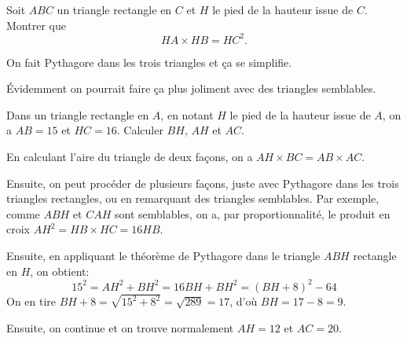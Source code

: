\begin{exo}
Soit $ABC$ un triangle rectangle en $C$ et $H$ le pied de la hauteur issue de $C$.
Montrer que 
\[ HA\times HB = HC^2.\]
\begin{center}
\end{center}
\begin{sol}
On fait Pythagore dans les trois triangles et ça se simplifie.

Évidemment on pourrait faire ça plus joliment avec des triangles semblables.
\end{sol}
\end{exo}





\begin{exo}
Dans un triangle rectangle en $A$, en notant $H$ le pied de la hauteur issue de $A$, on a $AB=15$ et $HC=16$.
Calculer $BH$, $AH$ et $AC$.
\begin{center}
\end{center}
\begin{sol}
En calculant l'aire du triangle de deux façons, on a $AH\times BC = AB\times AC$.

Ensuite, on peut procéder de plusieurs façons, juste avec Pythagore dans les trois triangles rectangles, ou en remarquant des triangles semblables.
Par exemple, comme $ABH$ et $CAH$ sont semblables, on a, par proportionnalité, le produit en croix $AH^2=HB\times HC = 16 HB$.

Ensuite, en appliquant le théorème de Pythagore dans le triangle $ABH$ rectangle en $H$, on obtient:
\[ 15^2 = AH^2+BH^2 = 16BH+BH^2 = (BH+8)^2-64\]
On en tire $BH+8=\sqrt{15^2+8^2}=\sqrt{289}=17$, d'où $BH=17-8=9$.

Ensuite, on continue et on trouve normalement $AH=12$ et $AC=20$.
\end{sol}
\end{exo}






